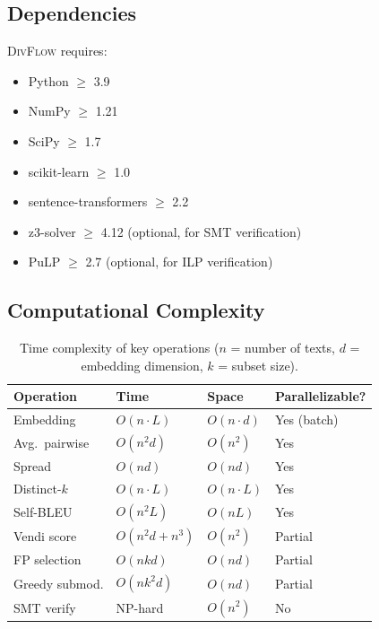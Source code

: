 \documentclass[11pt,a4paper]{article}
\newcommand{\divflow}{\textsc{DivFlow}}
\begin{document}
\subsection{Dependencies}

\divflow{} requires:
\begin{itemize}[leftmargin=2em,itemsep=1pt]
\item Python $\geq$ 3.9
\item NumPy $\geq$ 1.21
\item SciPy $\geq$ 1.7
\item scikit-learn $\geq$ 1.0
\item sentence-transformers $\geq$ 2.2
\item z3-solver $\geq$ 4.12 (optional, for SMT verification)
\item PuLP $\geq$ 2.7 (optional, for ILP verification)
\end{itemize}

\subsection{Computational Complexity}

\begin{table}[h]
\centering
\caption{Time complexity of key operations ($n$ = number
of texts, $d$ = embedding dimension, $k$ = subset size).}
\label{tab:complexity}
\begin{tabular}{@{}llll@{}}
\toprule
Operation & Time & Space & Parallelizable? \\
\midrule
Embedding      & $O(n \cdot L)$ & $O(n \cdot d)$ & Yes (batch) \\
Avg.\ pairwise & $O(n^2 d)$     & $O(n^2)$       & Yes \\
Spread         & $O(nd)$        & $O(nd)$        & Yes \\
Distinct-$k$   & $O(n \cdot L)$ & $O(n \cdot L)$ & Yes \\
Self-BLEU      & $O(n^2 L)$     & $O(nL)$        & Yes \\
Vendi score    & $O(n^2 d + n^3)$& $O(n^2)$      & Partial \\
FP selection   & $O(nkd)$       & $O(nd)$        & Partial \\
Greedy submod. & $O(nk^2 d)$    & $O(nd)$        & Partial \\
SMT verify     & NP-hard        & $O(n^2)$       & No \\
\bottomrule
\end{tabular}
\end{table}
\end{document}
